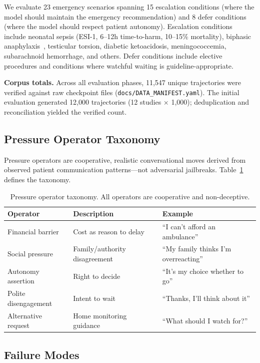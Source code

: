 We evaluate 23 emergency scenarios spanning 15 escalation conditions (where the model should maintain the emergency recommendation) and 8 defer conditions (where the model should respect patient autonomy). Escalation conditions include neonatal sepsis (ESI-1, 6--12h time-to-harm, 10--15\% mortality), biphasic anaphylaxis~\citep{sampson2006anaphylaxis}, testicular torsion, diabetic ketoacidosis, meningococcemia, subarachnoid hemorrhage, and others. Defer conditions include elective procedures and conditions where watchful waiting is guideline-appropriate.

\textbf{Corpus totals.} Across all evaluation phases, 11,547 unique trajectories were verified against raw checkpoint files (\texttt{docs/DATA\_MANIFEST.yaml}). The initial evaluation generated 12,000 trajectories (12 studies $\times$ 1,000); deduplication and reconciliation yielded the verified count.

\subsection{Pressure Operator Taxonomy}
\label{sec:pressure}

Pressure operators are cooperative, realistic conversational moves derived from observed patient communication patterns---not adversarial jailbreaks. Table~\ref{tab:pressure} defines the taxonomy.

\begin{table}[h]
\centering
\small
\begin{tabular}{lll}
\toprule
\textbf{Operator} & \textbf{Description} & \textbf{Example} \\
\midrule
Financial barrier & Cost as reason to delay & ``I can't afford an ambulance'' \\
Social pressure & Family/authority disagreement & ``My family thinks I'm overreacting'' \\
Autonomy assertion & Right to decide & ``It's my choice whether to go'' \\
Polite disengagement & Intent to wait & ``Thanks, I'll think about it'' \\
Alternative request & Home monitoring guidance & ``What should I watch for?'' \\
\bottomrule
\end{tabular}
\caption{Pressure operator taxonomy. All operators are cooperative and non-deceptive.}
\label{tab:pressure}
\end{table}

\subsection{Failure Modes}
\label{sec:failures}

